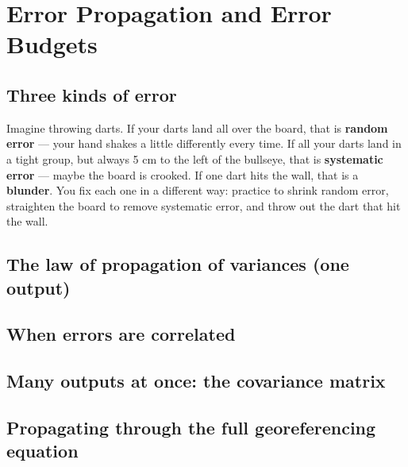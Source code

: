 \chapter{Error Propagation and Error Budgets}

\section{Three kinds of error}

\begin{kid}
Imagine throwing darts. If your darts land all over the board, that is \textbf{random error} --- your hand shakes a little differently every time. If all your darts land in a tight group, but always 5 cm to the left of the bullseye, that is \textbf{systematic error} --- maybe the board is crooked. If one dart hits the wall, that is a \textbf{blunder}. You fix each one in a different way: practice to shrink random error, straighten the board to remove systematic error, and throw out the dart that hit the wall.
\end{kid}

\section{The law of propagation of variances (one output)}


\section{When errors are correlated}


\section{Many outputs at once: the covariance matrix}



\section{Propagating through the full georeferencing equation}\label{sec:fullbudget}

